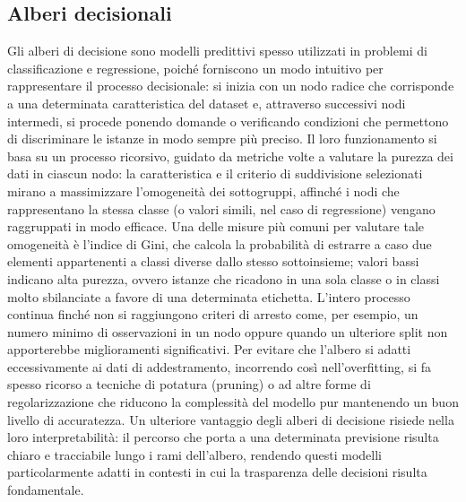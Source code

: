 \subsection{Alberi decisionali}\label{subsec:decision_tree}
Gli alberi di decisione sono modelli predittivi spesso utilizzati in problemi di classificazione e regressione, poiché forniscono un modo intuitivo per rappresentare il processo decisionale: si inizia con un nodo radice che corrisponde a una determinata caratteristica del dataset e, attraverso successivi nodi intermedi, si procede ponendo domande o verificando condizioni che permettono di discriminare le istanze in modo sempre più preciso. Il loro funzionamento si basa su un processo ricorsivo, guidato da metriche volte a valutare la purezza dei dati in ciascun nodo: la caratteristica e il criterio di suddivisione selezionati mirano a massimizzare l’omogeneità dei sottogruppi, affinché i nodi che rappresentano la stessa classe (o valori simili, nel caso di regressione) vengano raggruppati in modo efficace. Una delle misure più comuni per valutare tale omogeneità è l’indice di Gini, che calcola la probabilità di estrarre a caso due elementi appartenenti a classi diverse dallo stesso sottoinsieme; valori bassi indicano alta purezza, ovvero istanze che ricadono in una sola classe o in classi molto sbilanciate a favore di una determinata etichetta. L’intero processo continua finché non si raggiungono criteri di arresto come, per esempio, un numero minimo di osservazioni in un nodo oppure quando un ulteriore split non apporterebbe miglioramenti significativi. Per evitare che l’albero si adatti eccessivamente ai dati di addestramento, incorrendo così nell’overfitting, si fa spesso ricorso a tecniche di potatura (pruning) o ad altre forme di regolarizzazione che riducono la complessità del modello pur mantenendo un buon livello di accuratezza. Un ulteriore vantaggio degli alberi di decisione risiede nella loro interpretabilità: il percorso che porta a una determinata previsione risulta chiaro e tracciabile lungo i rami dell’albero, rendendo questi modelli particolarmente adatti in contesti in cui la trasparenza delle decisioni risulta fondamentale.